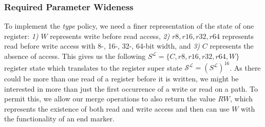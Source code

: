 \subsubsection{Required Parameter Wideness}
\label{subsection:requiredparamwideness}
To implement the \emph{type} policy, we need a finer representation of the state of one register:
\textit{1)} $W$ represents write before read access,
\textit{2)} $r8, r16, r32, r64$ represents read before write access with 8-, 16-, 32-, 64-bit width, and
\textit{3)} $C$ represents the absence of access.
This gives us the following $S^\mathcal{L} = \{ C, r8, r16, r32, r64, W \}$ register state which translates to the register super state 
$\mathcal{S}^\mathcal{L} = (S^\mathcal{L})^{16}$.
As there could be more than one read of a register before it is written, we might be interested in more than just the first occurrence of a write or read on a path. 
To permit this, we allow our merge operations to also return the value $RW$, which represents the existence of both read and write access and then can use $W$ with the functionality of an end marker.
